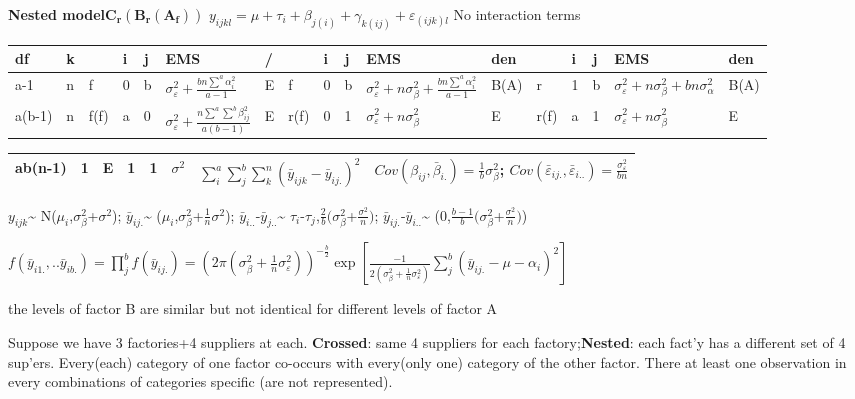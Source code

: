 \documentclass[
  10pt,
  twocolumn]{article}
\begin{document}
\textbf{Nested model}\(\mathbf{C_r(B_r(A_f))}\)
\(y_{ijkl}=\mu+\tau_i+\beta_{j(i)}+\gamma_{k(ij)}+\varepsilon_{(ijk)l}\)
No interaction terms

\begin{tabular}{ l|l|l|l|l|l|l|l|l|l|l|l|l|l|l|l|l }\hline
df & k &  &i&j& EMS & /& & i & j & EMS & den& & i & j & EMS&den\\\hline
a-1& n &f &0&b&$\sigma_{\varepsilon}^2+\frac{bn\sum^a\alpha_{i}^2}{a-1}$&E& f&0&b& $\sigma_{\varepsilon}^2+n\sigma^2_{\beta}+\frac{bn\sum^a\alpha_{i}^2}{a-1}$&B(A)&r&1&b&$\sigma_{\varepsilon}^2+n\sigma^2_{\beta}+bn\sigma^2_{\alpha}$&B(A)\\
a(b-1)&n&f(f)&a&0&$\sigma_{\varepsilon}^2+\frac{n\sum^a\sum^b\beta_{ij}^2}{a(b-1)}$&E& r(f)&0&1&$\sigma_{\varepsilon}^2+n\sigma^2_{\beta}$&E&r(f)&a&1&$\sigma_{\varepsilon}^2+n\sigma^2_{\beta}$&E\\\hline
\end{tabular}
\begin{tabular}{ l|l|l|l|l|l|l|l }\hline
ab(n-1)&1&E&1&1&$\sigma^2$ & $\sum_{i}^a\sum_{j}^b\sum_{k}^n(\bar y_{ijk}-\bar y_{ij.})^2$& $Cov(\beta_{ij},\bar\beta_{i.})=\frac1b\sigma_{\beta}^2$; $Cov(\bar\varepsilon_{ij.},\bar\varepsilon_{i..})=\frac{\sigma_{\varepsilon}^2}{bn}$\\\hline
\end{tabular}

\(y_{ijk}\)\textasciitilde{}
N(\(\mu_i\),\(\sigma^2_{\beta}\)+\(\sigma^2\));
\(\bar y_{ij.}\)\textasciitilde{}
(\(\mu_i\),\(\sigma^2_{\beta}\)+\(\frac1n\sigma^2\));
\(\bar y_{i..}\)-\(\bar y_{j..}\)\textasciitilde{}
\(\tau_i\)-\(\tau_j\),\(\frac2{b}(\sigma^2_{\beta}\)+\(\frac{\sigma^2}{n})\);
\(\bar y_{ij.}\)-\(\bar y_{i..}\)\textasciitilde{}
(0,\(\frac{b-1}{b}(\sigma_{\beta}^2\)+\(\frac{\sigma^2}{n})\))

\(f(\bar y_{i1.},..\bar y_{ib.})=\prod_{j}^bf(\bar y_{ij.})=(2\pi(\sigma^2_{\beta}+\frac{1}n\sigma_{\varepsilon}^2))^{-\frac{b}2}\exp[\frac{-1}{2(\sigma^2_{\beta}+\frac{1}n\sigma_{\varepsilon}^2)}\sum_{j}^b(\bar y_{ij.}-\mu-\alpha_i)^2]\)

the levels of factor B are similar but not identical for different
levels of factor A

Suppose we have 3 factories+4 suppliers at each. \textbf{Crossed}: same
4 suppliers for each factory;\textbf{Nested}: each fact'y has a
different set of 4 sup'ers. Every(each) category of one factor co-occurs
with every(only one) category of the other factor. There at least one
observation in every combinations of categories specific (are not
represented).
\end{document}

